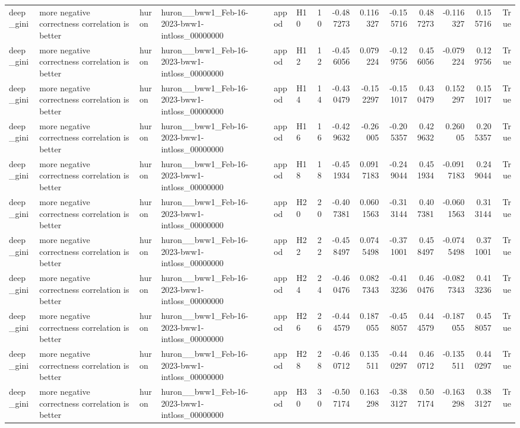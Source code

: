 \begin{longtable}{llllllrrrrrrrr}
deep\_gini & more negative correctness correlation is better & huron & huron\_\_bww1\_Feb-16-2023-bww1-intloss\_00000000 & appod & H10 & 10 & -0.487273 & 0.116327 & -0.155716 & 0.487273 & -0.116327 & 0.155716 & True \\
deep\_gini & more negative correctness correlation is better & huron & huron\_\_bww1\_Feb-16-2023-bww1-intloss\_00000000 & appod & H12 & 12 & -0.456056 & 0.079224 & -0.129756 & 0.456056 & -0.079224 & 0.129756 & True \\
deep\_gini & more negative correctness correlation is better & huron & huron\_\_bww1\_Feb-16-2023-bww1-intloss\_00000000 & appod & H14 & 14 & -0.430479 & -0.152297 & -0.151017 & 0.430479 & 0.152297 & 0.151017 & True \\
deep\_gini & more negative correctness correlation is better & huron & huron\_\_bww1\_Feb-16-2023-bww1-intloss\_00000000 & appod & H16 & 16 & -0.429632 & -0.26005 & -0.205357 & 0.429632 & 0.26005 & 0.205357 & True \\
deep\_gini & more negative correctness correlation is better & huron & huron\_\_bww1\_Feb-16-2023-bww1-intloss\_00000000 & appod & H18 & 18 & -0.451934 & 0.0917183 & -0.249044 & 0.451934 & -0.0917183 & 0.249044 & True \\
deep\_gini & more negative correctness correlation is better & huron & huron\_\_bww1\_Feb-16-2023-bww1-intloss\_00000000 & appod & H20 & 20 & -0.407381 & 0.0601563 & -0.313144 & 0.407381 & -0.0601563 & 0.313144 & True \\
deep\_gini & more negative correctness correlation is better & huron & huron\_\_bww1\_Feb-16-2023-bww1-intloss\_00000000 & appod & H22 & 22 & -0.458497 & 0.0745498 & -0.371001 & 0.458497 & -0.0745498 & 0.371001 & True \\
deep\_gini & more negative correctness correlation is better & huron & huron\_\_bww1\_Feb-16-2023-bww1-intloss\_00000000 & appod & H24 & 24 & -0.460476 & 0.0827343 & -0.413236 & 0.460476 & -0.0827343 & 0.413236 & True \\
deep\_gini & more negative correctness correlation is better & huron & huron\_\_bww1\_Feb-16-2023-bww1-intloss\_00000000 & appod & H26 & 26 & -0.444579 & 0.187055 & -0.458057 & 0.444579 & -0.187055 & 0.458057 & True \\
deep\_gini & more negative correctness correlation is better & huron & huron\_\_bww1\_Feb-16-2023-bww1-intloss\_00000000 & appod & H28 & 28 & -0.460712 & 0.135511 & -0.440297 & 0.460712 & -0.135511 & 0.440297 & True \\
deep\_gini & more negative correctness correlation is better & huron & huron\_\_bww1\_Feb-16-2023-bww1-intloss\_00000000 & appod & H30 & 30 & -0.507174 & 0.163298 & -0.383127 & 0.507174 & -0.163298 & 0.383127 & True \\

\end{longtable}
